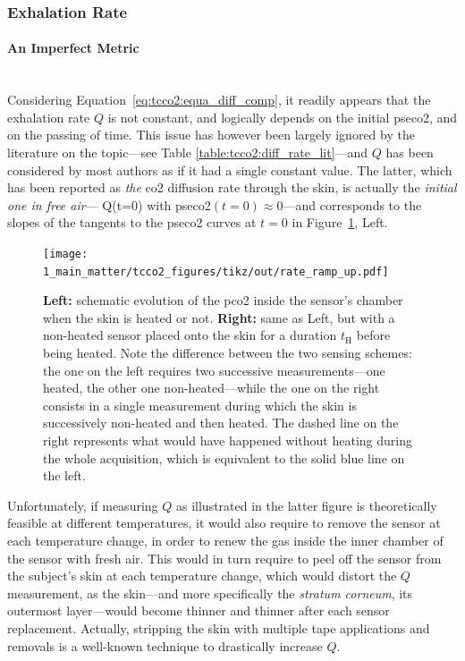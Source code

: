 \subsubsection{Exhalation Rate}\label{subsect:tcco2:dis_skin_conduct}

\paragraph{An Imperfect Metric}\label{sect:tcco2:q_metric_choice}\mbox{}\\

Considering Equation~\ref{eq:tcco2:equa_diff_comp}, it readily appears that the exhalation rate $Q$ is not constant, and logically depends on the initial \gls{pseco2}, and on the passing of time. This issue has however been largely ignored by the literature on the topic---see Table \ref{table:tcco2:diff_rate_lit}---and $Q$ has been considered by most authors as if it had a single constant value. The latter, which has been reported as \emph{the} \gls{co2} diffusion rate through the skin, is actually the \emph{initial one in free air}---\ie{} Q(t=0) with \gls{pseco2}$(t=0)\approx 0$---and corresponds to the slopes of the tangents to the \gls{pseco2} curves at $t=0$ in Figure~\ref{fig:tcco2:rate_principle}, Left.

\begin{figure}
	\centering
	\texttt{[image: 1\_main\_matter/tcco2\_figures/tikz/out/rate\_ramp\_up.pdf]}
	\caption[\gls{pseco2} ramp up in single- or multiple-temperatures measurement scenarios.]{\textbf{Left:} schematic evolution of the \gls{pco2} inside the sensor's chamber when the skin is heated or not. \textbf{Right:} same as Left, but with a non-heated sensor placed onto the skin for a duration $t_\text{H}$ before being heated. Note the difference between the two sensing schemes: the one on the left requires two successive measurements---one heated, the other one non-heated---while the one on the right consists in a single measurement during which the skin is successively non-heated and then heated. The dashed line on the right represents what would have happened without heating during the whole acquisition, which is equivalent to the solid blue line on the left.}\label{fig:tcco2:rate_principle}
\end{figure}

Unfortunately, if measuring $Q$ as illustrated in the latter figure is theoretically feasible at different temperatures, it would also require to remove the sensor at each temperature change, in order to renew the gas inside the inner chamber of the sensor with fresh air. This would in turn require to peel off the sensor from the subject's skin at each temperature change, which would distort the $Q$ measurement, as the skin---and more specifically the \textit{stratum corneum}, its outermost layer---would become thinner and thinner after each sensor replacement. Actually, stripping the skin with multiple tape applications and removals is a well-known technique to drastically increase $Q$\cite{scheuplein1976, eletr1978, greenspan1981}.

